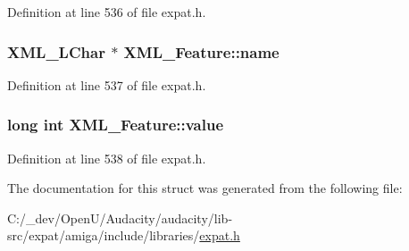 Definition at line 536 of file expat.\+h.

\subsubsection[{\texorpdfstring{name}{name}}]{ {\bf X\+M\+L\+\_\+\+L\+Char} $\ast$ X\+M\+L\+\_\+\+Feature\+::name}\hypertarget{struct_x_m_l___feature_a2ea400d7b861801d99c6d69a0713fa0c}{}\label{struct_x_m_l___feature_a2ea400d7b861801d99c6d69a0713fa0c}


Definition at line 537 of file expat.\+h.

\subsubsection[{\texorpdfstring{value}{value}}]{\setlength{\rightskip}{0pt plus 5cm}long {\bf int} X\+M\+L\+\_\+\+Feature\+::value}\hypertarget{struct_x_m_l___feature_a4d50cc5cb43a39f49435d0e81a4189dd}{}\label{struct_x_m_l___feature_a4d50cc5cb43a39f49435d0e81a4189dd}


Definition at line 538 of file expat.\+h.



The documentation for this struct was generated from the following file\+:\begin{DoxyCompactItemize}
\item 
C\+:/\+\_\+dev/\+Open\+U/\+Audacity/audacity/lib-\/src/expat/amiga/include/libraries/\hyperlink{amiga_2include_2libraries_2expat_8h}{expat.\+h}\end{DoxyCompactItemize}
